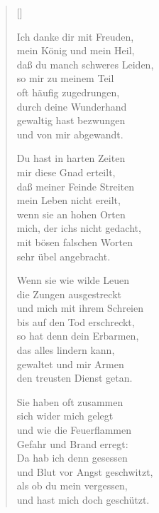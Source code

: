\begin{multicols}{2}
\settowidth{\versewidth}{Ich danke dir mit Freuden,}
\begin{verse}[\versewidth]

 Ich danke dir mit Freuden,\\
mein König und mein Heil,\\
daß du manch schweres Leiden,\\
so mir zu meinem Teil\\
oft häufig zugedrungen,\\
durch deine Wunderhand\\
gewaltig hast bezwungen\\
und von mir abgewandt.

 Du hast in harten Zeiten\\
mir diese Gnad erteilt,\\
daß meiner Feinde Streiten\\
mein Leben nicht ereilt,\\
wenn sie an hohen Orten\\
mich, der ichs nicht gedacht,\\
mit bösen falschen Worten\\
sehr übel angebracht.

 Wenn sie wie wilde Leuen\\
die Zungen ausgestreckt\\
und mich mit ihrem Schreien\\
bis auf den Tod erschreckt,\\
so hat denn dein Erbarmen,\\
das alles lindern kann,\\
gewaltet und mir Armen\\
den treusten Dienst getan.

 Sie haben oft zusammen\\
sich wider mich gelegt\\
und wie die Feuerflammen\\
Gefahr und Brand erregt:\\
Da hab ich denn gesessen\\
und Blut vor Angst geschwitzt,\\
als ob du mein vergessen,\\
und hast mich doch geschützt.


\end{verse}
\end{multicols}
